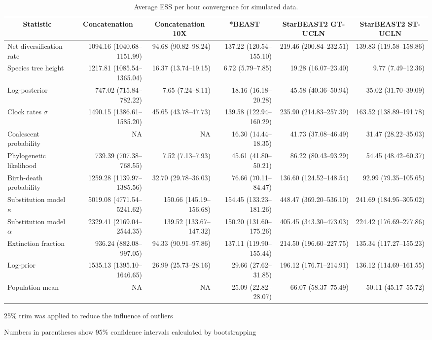 \documentclass[12pt]{article}
\begin{document}
\begin{landscape}
\clearpage

\begin{table}[htb!]
\centering
\caption{Average ESS per hour convergence for simulated data.}
\label{tab:simulatedPerHour}
\begin{threeparttable}
\begin{adjustbox}{center}
\renewcommand{\arraystretch}{1.2}
\scriptsize
\begin{tabular}{|l|r|r|r|r|r|}
\multicolumn{1}{c}{Statistic} & \multicolumn{1}{c}{Concatenation} & \multicolumn{1}{c}{Concatenation 10X} & \multicolumn{1}{c}{*BEAST} & \multicolumn{1}{c}{StarBEAST2 GT-UCLN} & \multicolumn{1}{c}{StarBEAST2 ST-UCLN}\tabularnewline
\hline
Net diversification rate & 1094.16 (1040.68--1151.99) & 94.68 (90.82--98.24) & 137.22 (120.54--155.10) & 219.46 (200.84--232.51) & 139.83 (119.58--158.86)\tabularnewline
\hline
Species tree height & 1217.81 (1085.54--1365.04) & 16.37 (13.74--19.15) & 6.72 (5.79--7.85) & 19.28 (16.07--23.40) & 9.77 (7.49--12.36)\tabularnewline
\hline
Log-posterior & 747.02 (715.84--782.22) & 7.65 (7.24--8.11) & 18.16 (16.18--20.28) & 45.58 (40.36--50.94) & 35.02 (31.70--39.09)\tabularnewline
\hline
Clock rates $\sigma$ & 1490.15 (1386.61--1585.20) & 45.65 (43.78--47.73) & 139.58 (122.94--160.29) & 235.90 (214.83--257.39) & 163.52 (138.89--191.78)\tabularnewline
\hline
Coalescent probability & NA & NA & 16.30 (14.44--18.35) & 41.73 (37.08--46.49) & 31.47 (28.22--35.03)\tabularnewline
\hline
Phylogenetic likelihood & 739.39 (707.38--768.55) & 7.52 (7.13--7.93) & 45.61 (41.80--50.21) & 86.22 (80.43--93.29) & 54.45 (48.42--60.37)\tabularnewline
\hline
Birth-death probability & 1259.28 (1139.97--1385.56) & 32.70 (29.78--36.03) & 76.66 (70.11--84.47) & 136.60 (124.52--148.54) & 92.99 (79.35--105.65)\tabularnewline
\hline
Substitution model $\kappa$ & 5019.08 (4771.54--5241.62) & 150.66 (145.19--156.68) & 154.45 (133.23--181.26) & 448.47 (369.20--536.10) & 241.69 (184.95--305.02)\tabularnewline
\hline
Substitution model $\alpha$ & 2329.41 (2169.04--2544.35) & 139.52 (133.67--147.32) & 150.20 (131.60--175.26) & 405.45 (343.30--473.03) & 224.42 (176.69--277.86)\tabularnewline
\hline
Extinction fraction & 936.24 (882.08--997.05) & 94.33 (90.91--97.86) & 137.11 (119.90--155.44) & 214.50 (196.60--227.75) & 135.34 (117.27--155.23)\tabularnewline
\hline
Log-prior & 1535.13 (1395.10--1646.65) & 26.99 (25.73--28.16) & 29.66 (27.62--31.85) & 196.12 (176.71--214.91) & 136.12 (114.69--161.55)\tabularnewline
\hline
Population mean & NA & NA & 25.09 (22.82--28.07) & 66.07 (58.37--75.49) & 50.11 (45.17--55.72)\tabularnewline
\hline
\end{tabular}
\end{adjustbox}
\begin{tablenotes}
\scriptsize
\item 25\% trim was applied to reduce the influence of outliers
\item Numbers in parentheses show 95\% confidence intervals calculated by bootstrapping
\end{tablenotes}
\end{threeparttable}
\end{table}


\end{landscape}
\end{document}
